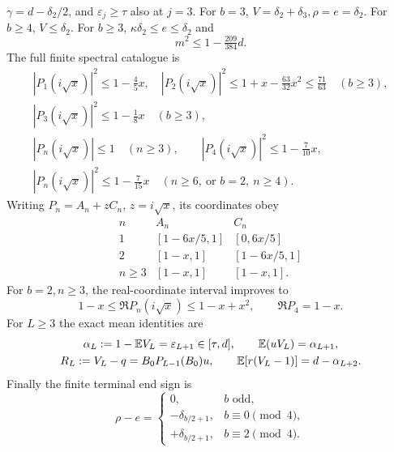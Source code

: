 \begin{lemma}
\(\gamma=d-\delta_2/2\), and \(\varepsilon_j\ge\tau\) also at \(j=3\).
For \(b=3\), \(V=\delta_2+\delta_3,\rho=e=\delta_2\).
For \(b\ge4\), \(V\le\delta_2\).
For \(b\ge3\), \(\kappa\delta_2\le e\le\delta_2\) and
\begin{equation}\label{eq:short-one:scale}
 m^2\le1-\tfrac{209}{384}d.
\end{equation}
The full finite spectral catalogue is
\begin{equation}\label{eq:short-one:norms}
\begin{gathered}
 |P_1(i\sqrt x)|^2\le1-\tfrac45x,\quad
 |P_2(i\sqrt x)|^2\le1+x-\tfrac{63}{32}x^2\le\tfrac{71}{63}
 \quad(b\ge3),\\
 |P_3(i\sqrt x)|^2\le1-\tfrac18x\quad(b\ge3),\\
 |P_n(i\sqrt x)|\le1\quad(n\ge3),\qquad
 |P_4(i\sqrt x)|^2\le1-\tfrac7{10}x,\\
 |P_n(i\sqrt x)|^2\le1-\tfrac7{15}x
 \quad(n\ge6,\ \text{or }b=2,\ n\ge4).
\end{gathered}
\end{equation}
Writing \(P_n=A_n+zC_n\), \(z=i\sqrt x\), its coordinates obey
\begin{equation}\label{eq:short-one:coordinates}
\begin{array}{c|cc}
 n&A_n&C_n\\ \hline
 1&[1-6x/5,1]&[0,6x/5]\\
 2&[1-x,1]&[1-6x/5,1]\\
 n\ge3&[1-x,1]&[1-x,1].
\end{array}
\end{equation}
For \(b=2,n\ge3\), the real-coordinate interval improves to
\begin{equation}\label{eq:short-one:terminal-two-profile}
 1-x\le\Re P_n(i\sqrt x)\le1-x+x^2,\qquad \Re P_4=1-x .
\end{equation}
For \(L\ge3\) the exact mean identities are
\begin{equation}\label{eq:short-one:means}
\begin{gathered}
 \alpha_L:=1-\mathbb E V_L=\varepsilon_{L+1}\in[\tau,d],\qquad
 \mathbb E(uV_L)=\alpha_{L+1},\\
 R_L:=V_L-q=B_0P_{L-1}(B_0)u,\qquad
 \mathbb E[r(V_L-1)]=d-\alpha_{L+2}.
\end{gathered}
\end{equation}
Finally the finite terminal end sign is
\begin{equation}\label{eq:short-one:end-sign}
 \rho-e=
 \begin{cases}
 0,&b\text{ odd},\\
 -\delta_{b/2+1},&b\equiv0\pmod4,\\
 +\delta_{b/2+1},&b\equiv2\pmod4.
 \end{cases}
\end{equation}
\end{lemma}
